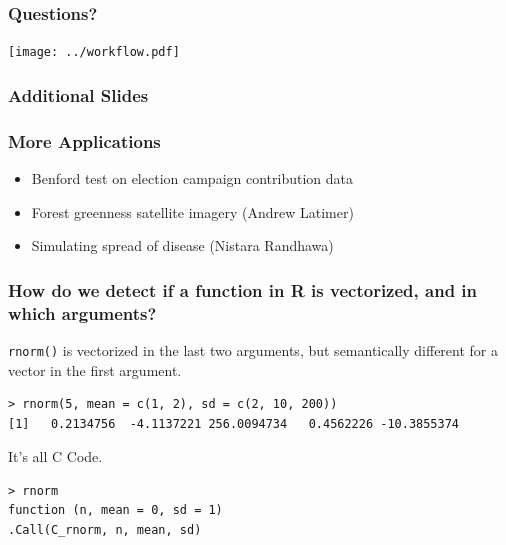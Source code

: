 \documentclass{beamer}
\begin{document}
\begin{frame}

    \frametitle{Questions?}
    \centerline{\texttt{[image: ../workflow.pdf]}}

\end{frame}
\begin{frame}

    \frametitle{Additional Slides}

\end{frame}
\begin{frame}

    \frametitle{More Applications}


\begin{itemize}
    \item Benford test on election campaign contribution data
    \item Forest greenness satellite imagery (Andrew Latimer)
    \item Simulating spread of disease (Nistara Randhawa)
\end{itemize}

\end{frame}
\begin{frame}[fragile]

    \frametitle{How do we detect if a function in R is vectorized, and in
    which arguments?}

    \texttt{rnorm()} is vectorized in the last two arguments, but
    semantically different for a vector in the first argument.

\begin{verbatim}
> rnorm(5, mean = c(1, 2), sd = c(2, 10, 200))
[1]   0.2134756  -4.1137221 256.0094734   0.4562226 -10.3855374
\end{verbatim}

It's all C Code.

\begin{verbatim}
> rnorm
function (n, mean = 0, sd = 1)
.Call(C_rnorm, n, mean, sd)
\end{verbatim}

\end{frame}
\end{document}
